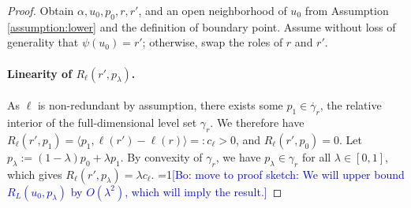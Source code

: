 \documentclass{article}
\theoremstyle{definition}\newtheorem{definition}{Definition}
\theoremstyle{definition}\newtheorem{assumption}{Assumption}
\newcommand{\Comments}{1}
\newcommand{\mynote}[2]{\ifnum\Comments=1\textcolor{#1}{#2}\fi}
\newcommand{\bo}[1]{\mynote{blue}{[Bo: #1]}}
\newcommand{\reals}{\mathbb{R}}
\newcommand{\inprod}[2]{\langle #1, #2 \rangle}%
\newcommand{\inter}[1]{\mathring{#1}}%
\begin{document}
\begin{proof}
  Obtain $\alpha, u_0, p_0, r, r'$, and an open neighborhood of $u_0$ from Assumption \ref{assumption:lower} and the definition of boundary point.
  Assume without loss of generality that $\psi(u_0) = r'$; otherwise, swap the roles of $r$ and $r'$.

  \paragraph{Linearity of $R_{\ell}(r',p_{\lambda})$.}
  As $\ell$ is non-redundant by assumption, there exists some $p_1 \in \inter{\gamma_r}$, the relative interior of the full-dimensional level set $\gamma_r$.
  We therefore have $R_\ell(r',p_1) = \inprod{p_1}{\ell(r')-\ell(r)} =: c_\ell > 0$, and $R_\ell(r',p_0) = 0$.
  Let $p_\lambda := (1-\lambda) p_0 + \lambda p_1$.
  By convexity of $\gamma_r$, we have $p_\lambda \in \gamma_r$ for all $\lambda \in [0,1]$, which gives $R_\ell(r',p_\lambda) = \lambda c_\ell$.
  \bo{move to proof sketch: We will upper bound $R_L(u_0,p_\lambda)$ by $O(\lambda^2)$, which will imply the result.}


\end{proof}
\end{document}
